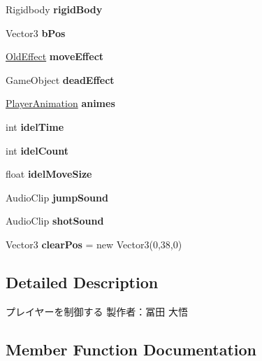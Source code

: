 \begin{DoxyCompactItemize}
Rigidbody {\bfseries rigid\+Body}
\item 
\mbox{\label{class_player_ae1e42d9c280dc8525006831c5439030e}} 
Vector3 {\bfseries b\+Pos}
\item 
\mbox{\label{class_player_a8e5cd06b6ab47deb2fb88a4e987039e9}} 
\hyperlink{class_old_effect}{Old\+Effect} {\bfseries move\+Effect}
\item 
\mbox{\label{class_player_a6e37b0206677fd9091b2b578fdec3201}} 
Game\+Object {\bfseries dead\+Effect}
\item 
\mbox{\label{class_player_af302cb3daa64bd88ed89b0dc3b34f1fa}} 
\hyperlink{class_player_animation}{Player\+Animation} {\bfseries animes}
\item 
\mbox{\label{class_player_a6ec008ca082e9573e4548ec09fca2577}} 
int {\bfseries idel\+Time}
\item 
\mbox{\label{class_player_ac27b6840c1a42bbf0a590a13bce7f83e}} 
int {\bfseries idel\+Count}
\item 
\mbox{\label{class_player_a992f1908a0b1350bda0b0969fe504394}} 
float {\bfseries idel\+Move\+Size}
\item 
\mbox{\label{class_player_a6eba3d88a52bee40d6dfd4727ffece36}} 
Audio\+Clip {\bfseries jump\+Sound}
\item 
\mbox{\label{class_player_a86d326507c64d2e83327a2598a28ba63}} 
Audio\+Clip {\bfseries shot\+Sound}
\item 
\mbox{\label{class_player_ab80bb2e2a57b2d13835085234e8a64c7}} 
Vector3 {\bfseries clear\+Pos} = new Vector3(0,38,0)
\end{DoxyCompactItemize}


\subsection{Detailed Description}
プレイヤーを制御する 製作者：冨田 大悟 



\subsection{Member Function Documentation}
\mbox{\label{class_player_aa4f5ff678bbdc84d859a144aca0975db}} 

